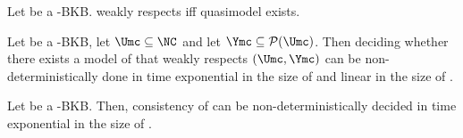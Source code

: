 \begin{definition}
  
\end{definition}

\begin{definition}
  
\end{definition}

\begin{definition}
  
\end{definition}

\begin{definition}[Quasimodel]
  
\end{definition}

\begin{lemma}
  Let \Bmf be a \SHOIQ-BKB. weakly respects iff quasimodel exists.
\end{lemma}

\begin{theorem}\label{thm:shoiq-bkb-consistency-nexptime}
  Let \Bmf be a \SHOIQ-BKB, let $\Umc \subseteq \NC$ and let $\Ymc\subseteq\powerset{\Umc}$. Then
  deciding whether there exists a model of \Bmf that weakly respects $(\Umc,\Ymc)$ can be
  non-deterministically done in time exponential in the size of \Bmf and linear in the size of \Ymc.
\end{theorem}

\begin{corollary}
  Let \Bmf be a \SHOIQ-BKB. Then, consistency of \Bmf can be non-deterministically decided in time
  exponential in the size of \Bmf.
\end{corollary}



